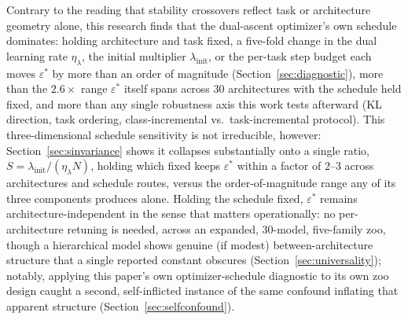 \documentclass[11pt]{article}
\newcommand{\eps}{\varepsilon}
\newcommand{\epsstar}{\eps^{*}}
\begin{document}
Contrary to the reading that stability
crossovers reflect task or architecture geometry alone, this research finds that the
dual-ascent optimizer's own schedule dominates: holding architecture and
task fixed, a five-fold change in the dual learning rate $\eta_\lambda$, the
initial multiplier $\lambda_{\mathrm{init}}$, or the per-task step budget
each moves $\epsstar$ by more than an order of magnitude
(Section~\ref{sec:diagnostic}), more than the $2.6\times$ range $\epsstar$
itself spans across 30 architectures with the
schedule held fixed, and more than any single robustness axis this work
tests afterward (KL direction, task ordering, class-incremental vs.\
task-incremental protocol). This three-dimensional schedule sensitivity is
not irreducible, however: Section~\ref{sec:sinvariance} shows it collapses
substantially onto a single ratio, $S=\lambda_{\mathrm{init}}/(\eta_\lambda N)$,
holding which fixed keeps $\epsstar$ within a factor of $2$--$3$ across
architectures and schedule routes, versus the order-of-magnitude range any
of its three components produces alone. Holding the schedule fixed,
$\epsstar$ remains architecture-independent in the sense that matters
operationally: no per-architecture retuning is needed, across an expanded,
30-model, five-family zoo, though a hierarchical model shows genuine (if
modest) between-architecture structure that a single reported constant
obscures (Section~\ref{sec:universality}); notably, applying this paper's
own optimizer-schedule diagnostic to its own zoo design caught a second,
self-inflicted instance of the same confound inflating that apparent
structure (Section~\ref{sec:selfconfound}).
\end{document}
